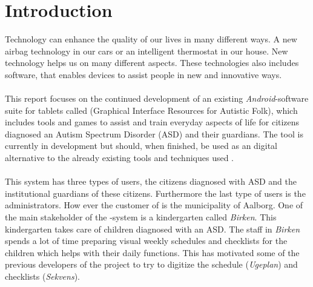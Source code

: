 \chapter{Introduction}
\label{cha:introduction}

Technology can enhance the quality of our lives in many different ways. A new airbag technology in our cars or an intelligent thermostat in our house. New technology helps us on many different aspects. These technologies also includes software, that enables devices to assist people in new and innovative ways.
\\\\
This report focuses on the continued development of an existing \emph{Android}-software suite for tablets called \giraf (Graphical Interface Resources for Autistic Folk), which includes tools and games to assist and train everyday aspects of life for citizens diagnosed an Autism Spectrum Disorder (ASD) \parencite{asd} and their guardians. The tool is currently in development but should, when finished, be used as an digital alternative to the already existing tools and techniques used \parencite{touch_autism}.
\\\\
This system has three types of users, the citizens diagnosed with ASD and the institutional guardians of these citizens. Furthermore the last type of users is the administrators. How ever the customer of \giraf is the municipality of Aalborg.
One of the main stakeholder of the \giraf-system is a kindergarten called \emph{Birken}. This kindergarten takes care of children diagnosed with an ASD. The staff in \emph{Birken} spends a lot of time preparing visual weekly schedules and checklists for the children which helps with their daily functions. This has motivated some of the previous developers of the \giraf project to try to digitize the schedule (\emph{Ugeplan}) and checklists (\emph{Sekvens}). 
\\\\



